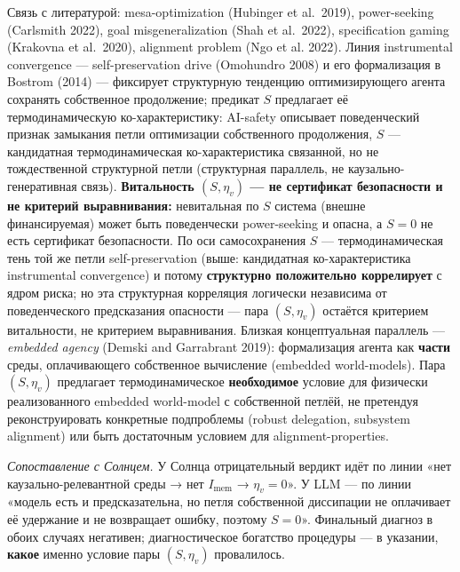 \documentclass[pdflatex,sn-mathphys-ay]{sn-jnl}
\begin{document}
Связь с литературой: mesa-optimization (Hubinger et al.~2019), power-seeking (Carlsmith 2022), goal misgeneralization (Shah et al.~2022), specification gaming (Krakovna et al.~2020), alignment problem (Ngo et al. 2022). Линия instrumental convergence --- self-preservation drive (Omohundro 2008) и его формализация в Bostrom (2014) --- фиксирует структурную тенденцию оптимизирующего агента сохранять собственное продолжение; предикат \(S\) предлагает её термодинамическую ко-характеристику: AI-safety описывает поведенческий признак замыкания петли оптимизации собственного продолжения, \(S\) --- кандидатная термодинамическая ко-характеристика связанной, но не тождественной структурной петли (структурная параллель, не каузально-генеративная связь). \textbf{Витальность \((S, \eta_v)\) --- не сертификат безопасности и не критерий выравнивания:} невитальная по \(S\) система (внешне финансируемая) может быть поведенчески power-seeking и опасна, а \(S = 0\) не есть сертификат безопасности. По оси самосохранения \(S\) --- термодинамическая тень той же петли self-preservation (выше: кандидатная ко-характеристика instrumental convergence) и потому \textbf{структурно положительно коррелирует} с ядром риска; но эта структурная корреляция логически независима от поведенческого предсказания опасности --- пара \((S, \eta_v)\) остаётся критерием витальности, не критерием выравнивания. Близкая концептуальная параллель --- \emph{embedded agency} (Demski and Garrabrant 2019): формализация агента как \textbf{части} среды, оплачивающего собственное вычисление (embedded world-models). Пара \((S, \eta_v)\) предлагает термодинамическое \textbf{необходимое} условие для физически реализованного embedded world-model с собственной петлёй, не претендуя реконструировать конкретные подпроблемы (robust delegation, subsystem alignment) или быть достаточным условием для alignment-properties.

\emph{Сопоставление с Солнцем.} У Солнца отрицательный вердикт идёт по линии «нет каузально-релевантной среды → нет \(I_{\text{mem}}\) → \(\eta_v = 0\)». У LLM --- по линии «модель есть и предсказательна, но петля собственной диссипации не оплачивает её удержание и не возвращает ошибку, поэтому \(S = 0\)». Финальный диагноз в обоих случаях негативен; диагностическое богатство процедуры --- в указании, \textbf{какое} именно условие пары \((S, \eta_v)\) провалилось.
\end{document}
